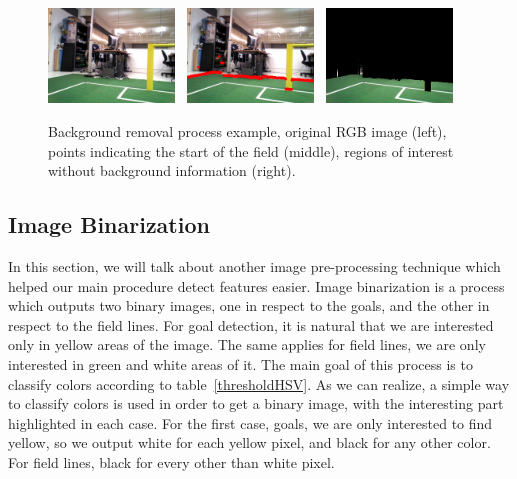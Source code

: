 \documentclass[	DIV=calc,%
							paper=a4,%
							fontsize=9pt,%
							twocolumn]{scrartcl}	 					%
\begin{document}
\begin{figure}[t!]
\caption{Background removal process example, original RGB image (left), points indicating the start of the field (middle), regions of interest without background information (right).}
\label{background}
\centering    
\includegraphics[width=0.3\textwidth]{figures/original.png} \	
\includegraphics[width=0.3\textwidth]{figures/back.png} \	
\includegraphics[width=0.3\textwidth]{figures/back_fixed.png}	
\end{figure}


\subsection{Image Binarization}
In this section, we will talk about another image pre-processing technique which helped our main procedure detect features easier. Image binarization is a process which outputs two binary images, one in respect to the goals, and the other in respect to the field lines. For goal detection, it is natural that we are interested only in yellow areas of the image. The same applies for field lines, we are only interested in green and white areas of it. The main goal of this process is to classify colors according to table~\ref{thresholdHSV}. As we can realize, a simple way to classify colors is used in order to get a binary image, with the interesting part highlighted in each case. For the first case, goals, we are only interested to find yellow, so we output white for each yellow pixel, and black for any other color. For field lines, black for every other than white pixel.
\end{document}
